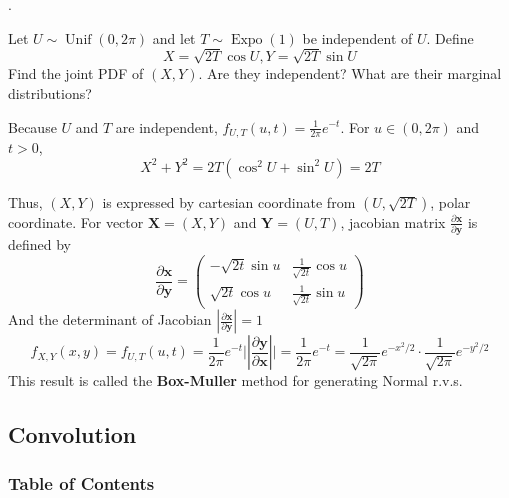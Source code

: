 \documentclass[8pt]{beamer}
\newcommand{\mb}[1]{\mathbf{#1}}
\newcommand{\tb}[1]{\textbf{#1}}
\newcommand{\Unif}[2]{\operatorname{Unif}\!\left(#1, #2\right)}
\newcommand{\Expo}[1]{\operatorname{Expo}\!\left(#1\right)}
\newcommand{\abs}[1]{\left\lvert #1 \right\rvert}
\begin{document}
\begin{frame}{.}
    \begin{example}
        Let $U \sim \Unif{0}{2\pi}$ and let $T \sim \Expo{1}$ be independent of $U$.
        Define
        \[
            X = \sqrt{2T} \cos{U}, Y = \sqrt{2T} \sin{U}
        \]
        Find the joint PDF of $(X,Y)$. Are they independent? What are their marginal distributions?

        Because $U$ and $T$ are independent, $f_{U,T}(u,t) = \frac{1}{2\pi}e^{-t}$.
        For $u \in (0, 2\pi)$ and $t >0$, 
        \[
            X^2 + Y^2 = 2T (\cos^2 U + \sin^2 U) = 2T
        \]

        Thus, $(X,Y)$ is expressed by cartesian coordinate from $(U,\sqrt{2T})$, polar coordinate.
        For vector $\mb{X} = (X,Y)$ and $\mb{Y} = (U,T)$, jacobian matrix $\frac{\partial \mb{x}}{\partial \mb{y}}$ is defined by 
        \[
        \frac{\partial \mb{x}}{\partial \mb{y}} = 
        \left(
            \begin{matrix}
                - \sqrt{2t} \sin u & \frac{1}{\sqrt{2t}} \cos u \\
                \sqrt{2t} \cos u & \frac{1}{\sqrt{2t}} \sin u
            \end{matrix}
        \right)
        \]
        And the determinant of Jacobian $\abs{\frac{\partial \mb{x}}{\partial \mb{y}}} = 1$
        \[
            f_{X,Y}(x,y) = f_{U,T} (u,t) = \frac{1}{2\pi} e^{-t} \vert \abs{\frac{\partial \mb{y}}{\partial \mb{x}}}\vert = \frac{1}{2\pi}e^{-t} = \frac{1}{\sqrt{2\pi}}e^{-x^2/2} \cdot \frac{1}{\sqrt{2\pi}} e^{-y^2/2}
        \]
        This result is called the \tb{Box-Muller} method for generating Normal r.v.s.
    \end{example}
\end{frame}

\subsection{Convolution}

\begingroup
    \begin{frame}
        \frametitle{Table of Contents}
        \tableofcontents[currentsubsection]
    \end{frame}
\endgroup
\end{document}
